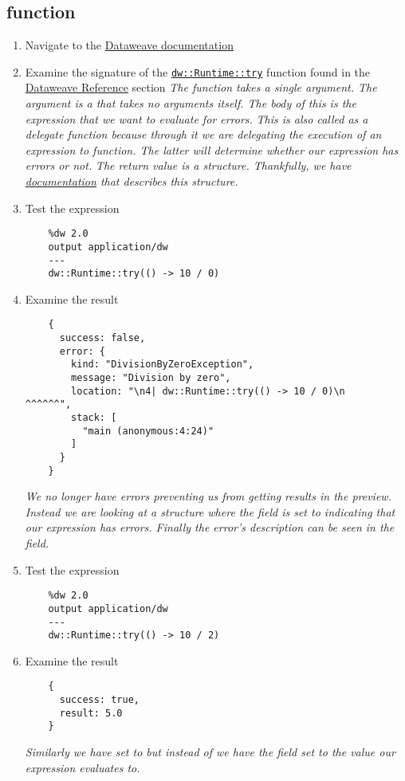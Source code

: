 \subsection{ function}
\begin{enumerate}[resume*]
\item Navigate to the \href{https://docs.mulesoft.com/mule-runtime/4.3/dataweave}{Dataweave documentation}
\item Examine the signature of the \href{https://docs.mulesoft.com/mule-runtime/4.3/dw-runtime-functions-try}{\lstinline{dw::Runtime::try}} function found in the \href{https://docs.mulesoft.com/mule-runtime/4.3/dw-functions}{Dataweave Reference} section
  \newline
  \emph{
    The  function takes a single argument.  The argument is a \les{} that takes no arguments itself.  The body of this \les{} is the expression that we want to evaluate for errors.
  }
  \newline
  \emph{
    This \les{} is also called as a delegate function because through it we are delegating the execution of an expression to  function.  The latter will determine whether our expression has errors or not.
  }
  \newline
  \emph{
    The return value is a  structure.  Thankfully, we have \href{https://docs.mulesoft.com/mule-runtime/4.3/dw-runtime-types}{documentation} that describes this structure.
  }
\item Test the  expression
  \begin{lstlisting}
    %dw 2.0
    output application/dw
    ---
    dw::Runtime::try(() -> 10 / 0)
  \end{lstlisting}
\item Examine the result
  \begin{lstlisting}
    {
      success: false,
      error: {
        kind: "DivisionByZeroException",
        message: "Division by zero",
        location: "\n4| dw::Runtime::try(() -> 10 / 0)\n                          ^^^^^^",
        stack: [
          "main (anonymous:4:24)"
        ]
      }
    }
  \end{lstlisting}
  \emph{
    We no longer have errors preventing us from getting results in the preview.  Instead we are looking at a  structure where the  field is set to  indicating that our expression has errors.  Finally the error's description can be seen in the  field.
  }
\item Test the  expression
  \begin{lstlisting}
    %dw 2.0
    output application/dw
    ---
    dw::Runtime::try(() -> 10 / 2)
  \end{lstlisting}
\item Examine the result
  \begin{lstlisting}
    {
      success: true,
      result: 5.0
    }
  \end{lstlisting}
  \emph{
    Similarly we have  set to  but instead of  we have the  field set to the value our expression evaluates to.
  }


\end{enumerate}
